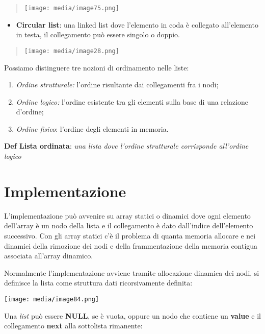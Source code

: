 \begin{quote}
\texttt{[image: media/image75.png]}
\end{quote}

\begin{itemize}
\item
  \textbf{Circular list}: una linked list dove l'elemento in coda è
  collegato all'elemento in testa, il collegamento può essere singolo o
  doppio.
\end{itemize}

\begin{quote}
\texttt{[image: media/image28.png]}
\end{quote}

Possiamo distinguere tre nozioni di ordinamento nelle liste:

\begin{enumerate}
\def\labelenumi{\arabic{enumi}.}
\item
  \emph{Ordine strutturale:} l'ordine risultante dai collegamenti fra i
  nodi;
\item
  \emph{Ordine logico:} l'ordine esistente tra gli elementi sulla base
  di una relazione d'ordine;
\item
  \emph{Ordine fisico}: l'ordine degli elementi in memoria.
\end{enumerate}

\textbf{Def \textbar{} Lista ordinata}: \emph{una lista dove l'ordine
strutturale corrisponde all'ordine logico}

\section{Implementazione}\label{implementazione}

L'implementazione può avvenire su array statici o dinamici dove ogni
elemento dell'array è un nodo della lista e il collegamento è dato
dall'indice dell'elemento successivo. Con gli array statici c'è il
problema di quanta memoria allocare e nei dinamici della rimozione dei
nodi e della frammentazione della memoria contigua associata all'array
dinamico.

Normalmente l'implementazione avviene tramite allocazione dinamica dei
nodi, si definisce la lista come struttura dati ricorsivamente definita:

\texttt{[image: media/image84.png]}

Una \emph{list} può essere \textbf{NULL}, se è vuota, oppure un nodo che
contiene un \textbf{value} e il collegamento \textbf{next} alla
sottolista rimanente:

